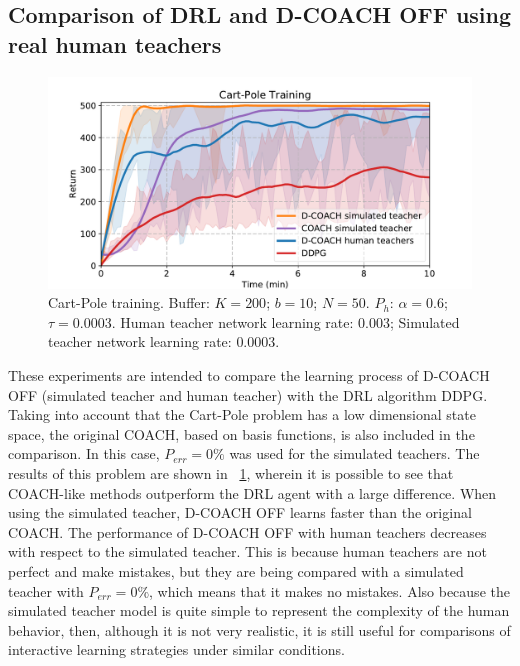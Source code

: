 \subsection{Comparison of DRL and D-COACH OFF using real human teachers}
\begin{figure}[t]
    \centering
    \vspace{-0.2cm}
    \includegraphics[width=0.9\linewidth]{imagenes/cap3/offline_cart_pole_humans.pdf}
    \vspace{-0.2cm}
    \caption{Cart-Pole training. Buffer: $K = 200$; $b = 10$; $N = 50$. $P_{h}$: $\alpha = 0.6$; $\tau = 0.0003$. Human teacher network learning rate: $0.003$; Simulated teacher network learning rate: $0.0003$.}
    \label{fig:cartpole_results}
\end{figure}

These experiments are intended to compare the learning process of D-COACH OFF (simulated teacher and human teacher) with the DRL algorithm DDPG. Taking into account that the Cart-Pole problem has a low dimensional state space, the original COACH, based on basis functions, is also included in the comparison. In this case, $P_\mathit{err}=0\%$ was used for the simulated teachers. The results of this problem are shown in \figurename~{\ref{fig:cartpole_results}}, wherein it is possible to see that COACH-like methods outperform the DRL agent with a large difference. When using the simulated teacher, D-COACH OFF learns faster than the original COACH. The performance of D-COACH OFF with human teachers decreases with respect to the simulated teacher. This is because human teachers are not perfect and make mistakes, but they are being compared with a simulated teacher with $P_\mathit{err}=0\%$, which means that it makes no mistakes. Also because the simulated teacher model is quite simple to represent the complexity of the human behavior, then, although it is not very realistic, it is still useful for comparisons of interactive learning strategies under similar conditions.

